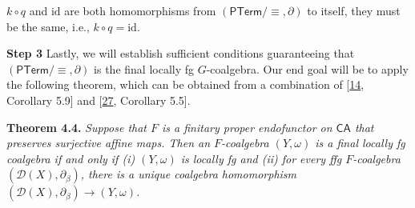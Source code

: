 \hypertarget{html:S4.SS0.SSSx2.p3.m10}{}\({k\circ q}\) and %
\hypertarget{html:S4.SS0.SSSx2.p3.m11}{}\({\mathrm{id}}\) are both homomorphisms from %
\hypertarget{html:S4.SS0.SSSx2.p3.m12}{}\({(\mathsf{PTerm}/{\equiv},\partial)}\) to itself, they must be the same, i.e., %
\hypertarget{html:S4.SS0.SSSx2.p3.m13}{}\({k\circ q=\mathrm{id}}\).
\par\medskip
\hypertarget{html:S4.SS0.SSSx3}{} \par\noindent\textbf{Step 3}\quad  %
\hypertarget{html:S4.SS0.SSSx3.p1}{} Lastly, we will establish sufficient conditions guaranteeing that %
\hypertarget{html:S4.SS0.SSSx3.p1.m1}{}\({(\mathsf{PTerm}/{\equiv},\partial)}\) is the final locally fg %
\hypertarget{html:S4.SS0.SSSx3.p1.m2}{}\({G}\)-coalgebra. Our end goal will be to apply the following theorem, which can be obtained from a combination of [\hyperlink{html:bib.bib14}{14}, Corollary 5.9] and [\hyperlink{html:bib.bib27}{27}, Corollary 5.5].
\par\medskip
\hypertarget{html:S4.Thmtheorem4}{} \par\noindent\textbf{\textbf{Theorem 4.4}\textbf{.}}\quad  %
\hypertarget{html:S4.Thmtheorem4.p1}{} \emph{Suppose that %
\hypertarget{html:S4.Thmtheorem4.p1.m1}{}\({F}\) is a finitary proper endofunctor on %
\hypertarget{html:S4.Thmtheorem4.p1.m2}{}\({\mathsf{CA}}\) that preserves surjective affine maps. Then an %
\hypertarget{html:S4.Thmtheorem4.p1.m3}{}\({F}\)-coalgebra %
\hypertarget{html:S4.Thmtheorem4.p1.m4}{}\({(Y,\omega)}\) is a final locally fg coalgebra if and only if (i) %
\hypertarget{html:S4.Thmtheorem4.p1.m5}{}\({(Y,\omega)}\) is locally fg and (ii) for every ffg %
\hypertarget{html:S4.Thmtheorem4.p1.m6}{}\({F}\)-coalgebra %
\hypertarget{html:S4.Thmtheorem4.p1.m7}{}\({({\mathcal{D}}(X),\partial_{\beta})}\), there is a unique coalgebra homomorphism %
\hypertarget{html:S4.Thmtheorem4.p1.m8}{}\({({\mathcal{D}}(X),\partial_{\beta})\to(Y,\omega)}\).}
\par\medskip
